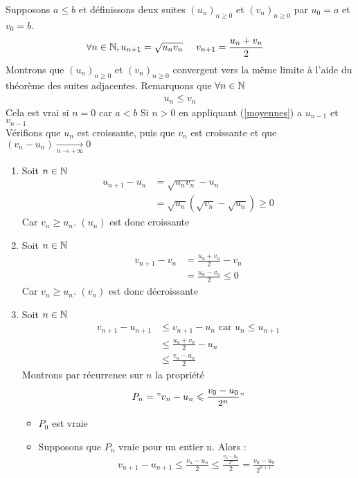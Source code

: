 \begin{exemple}
    Supposons $a \leq b$ et définissons deux suites $(u_n)_{n \geq 0}$ et $(v_n)_{n \geq 0}$ par $u_0 = a$ et $v_0 = b$. \\
    \begin{align*}
    \forall n \in \N,  u_{n + 1} &= \sqrt{u_n v_n} & \ v_{n + 1} &= \frac{u_n + v_n}{2}
    \end{align*}
    Montrons que $(u_n)_{n \geq 0}$ et $(v_n)_{n \geq 0}$ convergent vers la même limite à l'aide du théorème des suites adjacentes.
    Remarquons que $\forall n \in \N$
    \begin{align*}
        u_n \leq v_n
    \end{align*}
    Cela est vrai si $n = 0$ car $a < b$
    Si $n > 0$ en appliquant (\ref{moyennes}) a $u_{n-1}$ et $v_{n-1}$ \\
    Vérifions que $u_n$ est croissante, puis que $v_n$ est croissante et que $(v_n - u_n) \xrightarrow[n \to +\infty]{}  0$
    \begin{enumerate}
        \item Soit $n \in \N$
        \begin{align*}
            u_{n+1} - u_n &= \sqrt{u_nv_n} - u_n \\
                          &= \sqrt{u_n} \left( \sqrt{v_n} - \sqrt{u_n} \right) \geq 0
        \end{align*}
        Car $v_n \geq u_n$. $(u_n)$ est donc croissante
        \item Soit $n \in \N$
        \begin{align*}
            v_{n+1} - v_n &= \frac{u_n + v_n}{2} - v_n \\
                          &= \frac{u_n - v_n}{2} \leq 0
        \end{align*}
        Car $v_n \geq u_n$. $(v_n)$ est donc décroissante
        \item 
        Soit $n \in \N$
        \begin{align*}
            v_{n+1} - u_{n+1} &\leq v_{n+1} - u_n \text{ car } u_n \leq u_{n+1} \\
                              &\leq \frac{u_n+v_n}{2} - u_n \\
                              &\leq \frac{v_n - u_n}{2}
        \end{align*}
        Montrons par récurrence sur $n$ la propriété 
        \begin{equation*}
            P_n = "v_n - u_n \leq \frac{v_0 - u_0}{2^n}"
        \end{equation*}
        \begin{itemize}
            \item $P_0$ est vraie
            \item Supposons que $P_n$ vraie pour un entier n.
            Alors :
            \begin{align*}
                v_{n+1} - u_{n+1} \leq \frac{v_n - u_n}{2} \leq \frac{\frac{v_0 - u_0}{2^n}}{2} = \frac{v_0 - u_0}{2^{n+1}}
            \end{align*}
        \end{itemize}


\end{enumerate}
\end{exemple}
